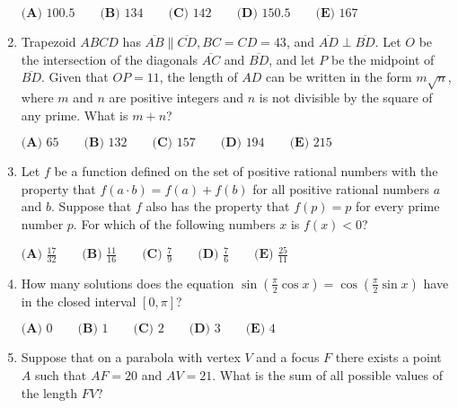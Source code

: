 \documentclass{article}
\begin{document}
\begin{enumerate}[label=\arabic*., itemsep=0.5em]
\(\textbf{(A) }100.5 \qquad \textbf{(B) }134 \qquad \textbf{(C) }142 \qquad \textbf{(D) }150.5\qquad \textbf{(E) }167\)\par \vspace{0.5em}\item Trapezoid \(ABCD\) has \(\overline{AB}\parallel\overline{CD},BC=CD=43\), and \(\overline{AD}\perp\overline{BD}\). Let \(O\) be the intersection of the diagonals \(\overline{AC}\) and \(\overline{BD}\), and let \(P\) be the midpoint of \(\overline{BD}\). Given that \(OP=11\), the length of \(AD\) can be written in the form \(m\sqrt{n}\), where \(m\) and \(n\) are positive integers and \(n\) is not divisible by the square of any prime. What is \(m+n\)?

\(\textbf{(A) }65 \qquad \textbf{(B) }132 \qquad \textbf{(C) }157 \qquad \textbf{(D) }194\qquad \textbf{(E) }215\)\par \vspace{0.5em}\item Let \(f\) be a function defined on the set of positive rational numbers with the property that \(f(a\cdot b)=f(a)+f(b)\) for all positive rational numbers \(a\) and \(b\). Suppose that \(f\) also has the property that \(f(p)=p\) for every prime number \(p\). For which of the following numbers \(x\) is \(f(x)<0\)?

\(\textbf{(A) }\frac{17}{32} \qquad \textbf{(B) }\frac{11}{16} \qquad \textbf{(C) }\frac79 \qquad \textbf{(D) }\frac76\qquad \textbf{(E) }\frac{25}{11}\)\par \vspace{0.5em}\item How many solutions does the equation \(\sin \left( \frac{\pi}2 \cos x\right)=\cos \left( \frac{\pi}2 \sin x\right)\) have in the closed interval \([0,\pi]\)?

\(\textbf{(A) }0 \qquad \textbf{(B) }1 \qquad \textbf{(C) }2 \qquad \textbf{(D) }3\qquad \textbf{(E) }4\)\par \vspace{0.5em}\item Suppose that on a parabola with vertex \(V\) and a focus \(F\) there exists a point \(A\) such that \(AF=20\) and \(AV=21\). What is the sum of all possible values of the length \(FV?\)


\end{enumerate}
\end{document}
